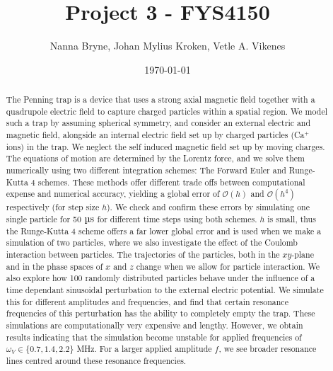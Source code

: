 



\title{Project 3 - FYS4150} 
\author{Nanna Bryne, Johan Mylius Kroken, Vetle A. Vikenes} 
\date{\today}                             
\noaffiliation                            

\begin{abstract}
    The Penning trap is a device that uses a strong axial magnetic field together with a quadrupole electric field to capture charged particles within a spatial region. We model such a trap by assuming spherical symmetry, and consider an external electric and magnetic field, alongside an internal electric field set up by charged particles (Ca$^+$ ions) in the trap. We neglect the self induced magnetic field set up by moving charges. The equations of motion are determined by the Lorentz force, and we solve them numerically using two different integration schemes: The Forward Euler and Runge-Kutta 4 schemes. These methods offer different trade offs between computational expense and numerical accuracy, yielding a global error of $\mathcal{O}(h)$ and $\mathcal{O}(h^4)$ respectively (for step size $h$). We check and confirm these errors by simulating one single particle for 50 $\mus$ for different time steps using both schemes. $h$ is small, thus the Runge-Kutta 4 scheme offers a far lower global error and is used when we make a simulation of two particles, where we also investigate the effect of the Coulomb interaction between particles. The trajectories of the particles, both in the $xy$-plane and in the phase spaces of $x$ and $z$ change when we allow for particle interaction. We also explore how 100 randomly distributed particles behave under the influence of a time dependant sinusoidal perturbation to the external electric potential. We simulate this for different amplitudes and frequencies, and find that certain resonance frequencies of this perturbation has the ability to completely empty the trap. These simulations are computationally very expensive and lengthy. However, we obtain results indicating that the simulation become unstable for applied frequencies of $\omega_V\in\{0.7,1.4, 2.2\}$ MHz. For a larger applied amplitude $f$, we see broader resonance lines centred around these resonance frequencies. 
\end{abstract}
\maketitle














 



